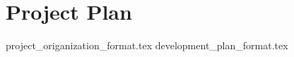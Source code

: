 \documentclass{article}
\begin{document}

\section*{Project Plan}
{project_origanization_format.tex}
{development_plan_format.tex}



\end{document}
